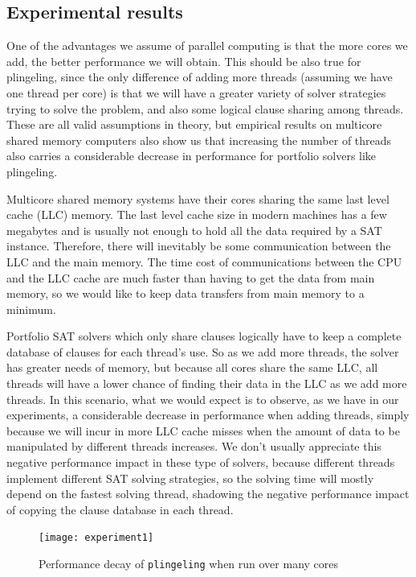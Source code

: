 \documentclass{llncs}
\begin{document}
\subsection{Experimental results}

One of the advantages we assume of parallel computing is that the more cores we add, the better performance we will obtain. This should be also true for plingeling, since the only difference of adding more threads (assuming we have one thread per core) is that we will have a greater variety of solver strategies trying to solve the problem, and also some logical clause sharing among threads. These are all valid assumptions in theory, but empirical results on multicore shared memory computers also show us that increasing the number of threads also carries a considerable decrease in performance for portfolio solvers like plingeling. 

Multicore shared memory systems have their cores sharing the same last level cache (LLC) memory. The last level cache size in modern machines has a few megabytes and is usually not enough to hold all the data required by a SAT instance. Therefore, there will inevitably be some communication between the LLC and the main memory. The time cost of communications between the CPU and the LLC cache are much faster than having to get the data from main memory, so we would like to keep data transfers from main memory to a minimum. 

Portfolio SAT solvers which only share clauses logically have to keep a complete database of clauses for each thread's use. So as we add more threads, the solver has greater needs of memory, but because all cores share the same LLC, all threads will have a lower chance of finding their data in the LLC as we add more threads. In this scenario, what we would expect is to observe, as we have in our experiments, a considerable decrease in performance when adding threads, simply because we will incur in more LLC cache misses when the amount of data to be manipulated by different threads increases. We don't usually appreciate this negative performance impact in these type of solvers, because different threads implement different SAT solving strategies, so the solving time will mostly depend on the fastest solving thread, shadowing the negative performance impact of copying the clause database in each thread.

\begin{figure}[tp]
  \centering
  \texttt{[image: experiment1]}
  \caption{Performance decay of {\tt plingeling} when run over many cores}
  \label{fig:decay}
\end{figure}
\end{document}
